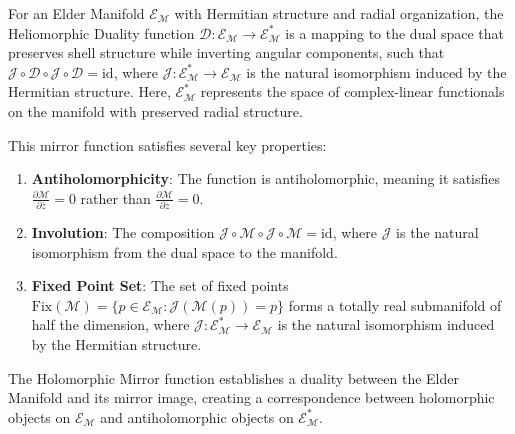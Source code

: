 \begin{definition}
For an Elder Manifold $\mathcal{E}_{\mathcal{M}}$ with Hermitian structure and radial organization, the Heliomorphic Duality function $\mathcal{D}: \mathcal{E}_{\mathcal{M}} \rightarrow \mathcal{E}_{\mathcal{M}}^*$ is a mapping to the dual space that preserves shell structure while inverting angular components, such that $\mathcal{J} \circ \mathcal{D} \circ \mathcal{J} \circ \mathcal{D} = \text{id}$, where $\mathcal{J}: \mathcal{E}_{\mathcal{M}}^* \rightarrow \mathcal{E}_{\mathcal{M}}$ is the natural isomorphism induced by the Hermitian structure. Here, $\mathcal{E}_{\mathcal{M}}^*$ represents the space of complex-linear functionals on the manifold with preserved radial structure.
\end{definition}

This mirror function satisfies several key properties:

\begin{enumerate}
\item \textbf{Antiholomorphicity}: The function is antiholomorphic, meaning it satisfies $\frac{\partial \mathcal{M}}{\partial \overline{z}} = 0$ rather than $\frac{\partial \mathcal{M}}{\partial z} = 0$.
\item \textbf{Involution}: The composition $\mathcal{J} \circ \mathcal{M} \circ \mathcal{J} \circ \mathcal{M} = \text{id}$, where $\mathcal{J}$ is the natural isomorphism from the dual space to the manifold.
\item \textbf{Fixed Point Set}: The set of fixed points $\text{Fix}(\mathcal{M}) = \{p \in \mathcal{E}_{\mathcal{M}} : \mathcal{J}(\mathcal{M}(p)) = p\}$ forms a totally real submanifold of half the dimension, where $\mathcal{J}: \mathcal{E}_{\mathcal{M}}^* \rightarrow \mathcal{E}_{\mathcal{M}}$ is the natural isomorphism induced by the Hermitian structure.
\end{enumerate}

\begin{theorem}
The Holomorphic Mirror function establishes a duality between the Elder Manifold and its mirror image, creating a correspondence between holomorphic objects on $\mathcal{E}_{\mathcal{M}}$ and antiholomorphic objects on $\mathcal{E}_{\mathcal{M}}^*$.
\end{theorem}

